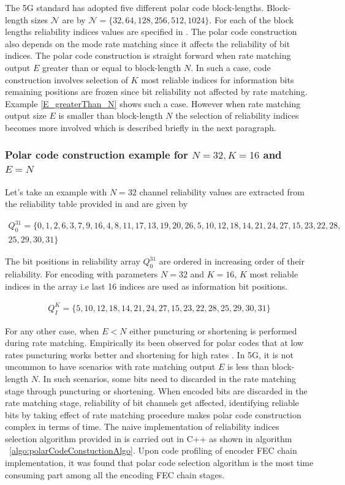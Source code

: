 The 5G standard has adopted five different polar code block-lengths. Block-length sizes $\mathcal{N}$ are by $\mathcal{N} = \{32,64,128,256,512,1024\}$.
For each of the block lengths reliability indices values are specified in \cite{3gpp.38.212}. The polar code construction also depends on the mode rate matching since it affects the reliability of bit indices. The polar code construction is straight forward when rate matching output $E$ greater than or equal to block-length $N$. In such a case, code construction involves selection of $K$ most reliable indices for information bits remaining positions are frozen since bit reliability not affected by rate matching. Example  \ref{E_greaterThan_N} shows such a case. However when rate matching output size $E$ is smaller than block-length $N$ the selection of reliability indices becomes more involved which is described briefly in the next paragraph.

\subsubsection*{Polar code construction example for $N = 32, K = 16$ and $E = N$} \label{E_greaterThan_N}
Let's take an example with $N = 32$ channel reliability values are extracted from the reliability table provided in \cite{3gpp.38.212} and are given by

\begin{eqnarray*}
Q_{0}^{31} = \{ 0, 1, 2, 6, 3, 7, 9, 16,4, 8, 11, 17, 13, 19, 20, 26, 5, 10, 12, 18, 14, 21, 24, 27, 15, 23, 22, 28,\\
25, 29, 30, 31 \}
\end{eqnarray*}

The bit positions in reliability array $Q_{0}^{31}$ are ordered in increasing order of their reliability. For encoding with parameters $N = 32$ and $K = 16$, $K$ most reliable indices in the array i.e last 16 indices are used as information bit positions. 

\begin{eqnarray*}
	Q_{\textit{I}}^{\textit{K}} =  \{5, 10, 12, 18, 14, 21, 24, 27, 15, 23, 22, 28,25, 29, 30, 31 \}
\end{eqnarray*} 

For any other case, when $E < N$ either puncturing or shortening is performed during rate matching. Empirically its been observed for polar codes that at low rates puncturing works better and shortening for high rates \cite{lowcomplexityPuncShorteng}. In 5G, it is not uncommon to have scenarios with rate matching output $E$ is less than block-length $N$. In such scenarios, some bits need to discarded in the rate matching stage through puncturing or shortening. When encoded bits are discarded in the rate matching stage, reliability of bit channels get affected, identifying reliable bits by taking effect of rate matching procedure makes polar code construction complex in terms of time. The naive implementation of reliability indices selection algorithm provided in \cite{3gpp.38.212} is carried out in C++ as shown in algorithm ~\ref{algo:polarCodeConstuctionAlgo}. Upon code profiling of encoder FEC chain implementation, it was found that polar code selection algorithm is the most time consuming part among all the encoding FEC chain stages.

